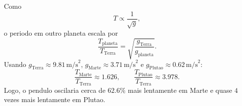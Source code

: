 Como
\[
T \propto \frac{1}{\sqrt{g}},
\]
o periodo em outro planeta escala por
\[
\frac{T_{\text{planeta}}}{T_{\text{Terra}}} = \sqrt{\frac{g_{\text{Terra}}}{g_{\text{planeta}}}}.
\]
Usando $g_{\text{Terra}}\approx 9.81\,\text{m/s}^2$, $g_{\text{Marte}}\approx 3.71\,\text{m/s}^2$ e $g_{\text{Plutao}}\approx 0.62\,\text{m/s}^2$:
\[
\frac{T_{\text{Marte}}}{T_{\text{Terra}}} \approx 1.626,
\qquad
\frac{T_{\text{Plutao}}}{T_{\text{Terra}}} \approx 3.978.
\]
Logo, o pendulo oscilaria cerca de $62.6\%$ mais lentamente em Marte e quase $4$ vezes mais lentamente em Plutao.

